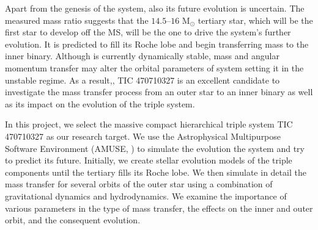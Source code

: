 Apart from the genesis of the system, also its future evolution is uncertain. The measured mass ratio suggests that the $14.5–16$ M$_{\odot}$ tertiary star, which will be the first star to develop off the MS, will be the one to drive the system's further evolution. It is predicted to fill its Roche lobe and begin transferring mass to the inner binary. Although is currently dynamically stable, mass and angular momentum transfer may alter the orbital parameters of system setting it in the unstable regime. As a result,, TIC 470710327 is an excellent candidate to investigate the mass transfer process from an outer star to an inner binary as well as its impact on the evolution of the triple system.

In this project, we select the massive compact hierarchical triple system TIC 470710327 as our research target. We use  the Astrophysical Multipurpose Software Environment (AMUSE, \cite{portegies2018astrophysical}) to simulate the evolution the system and try to predict its future. Initially, we create stellar evolution models of the triple components until the tertiary fills its Roche lobe. We then simulate in detail the  mass transfer for several orbits of the outer star using a combination of gravitational dynamics and hydrodynamics. We examine the importance of various parameters in the type of mass transfer, the effects on the inner and outer orbit, and the consequent evolution.





